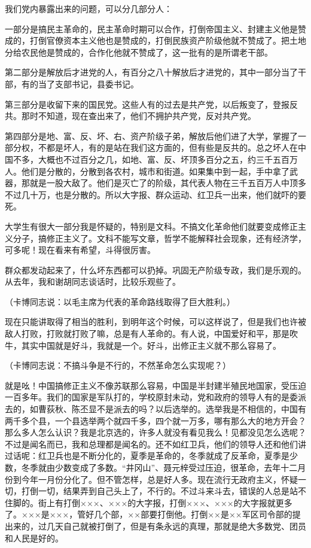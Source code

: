 我们党内暴露出来的问题，可以分几部分人：

一部分是搞民主革命的，民主革命时期可以合作，打倒帝国主义、封建主义他是赞成的，打倒官僚资本主义他也是赞成的，打倒民族资产阶级他就不赞成了。把土地分给农民他是赞成的，合作化他就不赞成了，这一批有的是所谓老干部。

第二部分是解放后才进党的人，有百分之八十解放后才进党的，其中一部分当了干部，有的当了支部书记，县委书记。

第三部分是收留下来的国民党。这些人有的过去是共产党，以后叛变了，登报反共。那时不知道，现在查出来了，他们不拥护共产党，反对共产党。

第四部分是地、富、反、坏、右、资产阶级子弟，解放后他们进了大学，掌握了一部分权，不都是坏人，有的是站在我们这方面的，但有些是反共的。总之坏人在中国不多，大概也不过百分之几，如地、富、反、坏顶多百分之五，约三千五百万人。他们是分散的，分散到各农村，城市和街道。如果集中到一起，手中拿了武器，那就是一股大敌了。他们是灭亡了的阶级，其代表人物在三千五百万人中顶多不过几十万，也是分散的。所以大字报、群众运动、红卫兵一出来，他们就吓的要死。

大学生有很大一部分我是怀疑的，特别是文科。不搞文化革命他们就要变成修正主义分子，搞修正主义了。文科不能写文章，哲学不能解释社会现象，还有经济学，可多呢！现在看来有希望，斗得很厉害。

群众都发动起来了，什么坏东西都可以扔掉。巩固无产阶级专政，我们是乐观的。从去年，我和谢胡同志谈话时，比较乐观些了。

（卡博同志说：以毛主席为代表的革命路线取得了巨大胜利。）

现在只能讲取得了相当的胜利，到明年这个时候，可以这样说了，但是我们也许被敌人打败，打败就打败了嘛，总是有人革命的。有人说，中国爱好和平，那是吹牛，其实中国就是好斗，我就是一个。好斗，出修正主义就不那么容易了。

（卡博同志说：不搞斗争是不行的，不然革命怎么实现呢？）

就是吆！中国搞修正主义不像苏联那么容易，中国是半封建半殖民地国家，受压迫一百多年。我们的国家是军队打的，学校原封未动，党和政府的领导人有的是委派去的，如曹荻秋、陈丕显不是派去的吗？以后选举的。选举我是不相信的，中国有两千多个县，一个县选举两个就四千多，四个就一万多，哪有那么大的地方开会？那么多人怎么认识？我是北京选的，许多人就没有看见我么！见都没见怎么选呢？不过是闻名而已，我和总理都是闻名的。还不如红卫兵，他们的领导人还和他们讲过话呢：红卫兵也是不断分化的，夏季是革命的，冬季就成了反革命，夏季是少数，冬季就由少数变成了多数。“井冈山”、聂元梓受过压迫，很革命，去年十二月份到今年一月份分化了。但不管怎样，总是好人多。现在流行无政府主义，怀疑一切，打倒一切，结果弄到自己头上了，不行的。不过斗来斗去，错误的人总是站不住脚的。街上有打倒×××、×××的大字报，打倒×××、×××的大字报就更多了。×××是×××，管好几个部，××部要打倒他。打倒××是××军区司令部的提出来的，过几天自己就被打倒了，但是有条永远的真理，那就是绝大多数党、团员和人民是好的。


